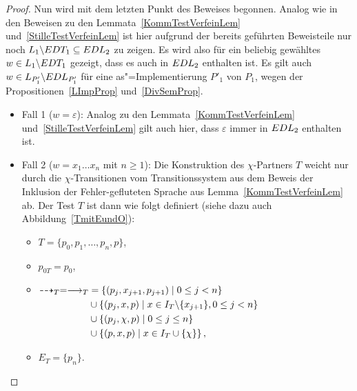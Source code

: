 \begin{proof}
  Nun wird mit dem letzten Punkt des Beweises begonnen. Analog wie in den
  Beweisen zu den Lemmata~\ref{KommTestVerfeinLem} und~\ref{StilleTestVerfeinLem}
  ist hier aufgrund der bereits geführten Beweisteile nur noch $L_1\backslash
  EDT _1 \subseteq EDL _2$ zu zeigen. Es wird also für ein beliebig gewähltes
  $w\in L_1\backslash EDT _1$ gezeigt, dass es auch in $EDL _2$ enthalten
  ist. Es gilt auch $w\in L _{P'_1}\backslash EDL _{P'_1}$ für eine
  as"=Implementierung $P'_1$ von $P_1$, wegen der Propositionen~\ref{LImpProp}
  und~\ref{DivSemProp}.
  \begin{itemize}
    \item Fall 1 ($w = \varepsilon$): Analog zu den
      Lemmata~\ref{KommTestVerfeinLem} und~\ref{StilleTestVerfeinLem} gilt auch
      hier, dass $\varepsilon$ immer in $EDL _2$ enthalten ist.
    \item Fall 2 ($w = x_1\dots x_n$ mit $n \geq 1$): Die Konstruktion des
      $\chi$-Partners $T$ weicht nur durch die $\chi$-Transitionen vom
      Transitionssystem aus dem Beweis der Inklusion der Fehler-gefluteten
      Sprache \EL{} aus Lemma~\ref{KommTestVerfeinLem} ab. Der Test $T$ ist
      dann wie folgt definiert (siehe dazu auch Abbildung~\ref{TmitEundO}):
      \begin{itemize}
        \item $T=\{p_0,p_1,\dots ,p_n,p\}$,
        \item $p_{0T}=p_0$,
        \item $\begin{aligned}[t]
            \may _T = \must _T &= \left\{(p_j,x_{j+1},p_{j+1})\mid 0\leq j<
            n\right\}\\
            &\cup\left\{(p_j,x,p)\mid x\in I_T\backslash\{x_{j+1}\},0\leq j <
            n\right\}\\
            &\cup\left\{(p_j,\chi ,p)\mid 0\leq j\leq n\right\}\\
            &\cup\left\{(p,x ,p)\mid x\in I_T\cup \{\chi\}\right\},
        \end{aligned}$
        \item $E_T=\{p_n\}$.
      \end{itemize}
      \begin{figure} [h!tbp]
      \begin{center}
\end{center}
\end{figure}
\end{itemize}
\end{proof}
